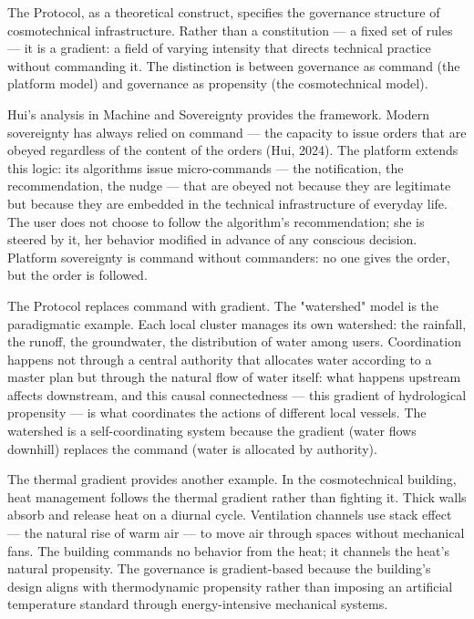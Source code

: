 The   Protocol, as a theoretical construct, specifies the governance structure of cosmotechnical infrastructure. Rather than a constitution — a fixed set of rules — it is a gradient: a field of varying intensity that directs technical practice without commanding it. The distinction is between governance as command (the platform model) and governance as propensity (the cosmotechnical model).

Hui's analysis in Machine and Sovereignty provides the framework. Modern sovereignty has always relied on command — the capacity to issue orders that are obeyed regardless of the content of the orders (Hui, 2024). The platform extends this logic: its algorithms issue micro-commands — the notification, the recommendation, the nudge — that are obeyed not because they are legitimate but because they are embedded in the technical infrastructure of everyday life. The user does not choose to follow the algorithm's recommendation; she is steered by it, her behavior modified in advance of any conscious decision. Platform sovereignty is command without commanders: no one gives the order, but the order is followed.

The  Protocol replaces command with gradient. The "watershed" model is the paradigmatic example. Each local  cluster manages its own watershed: the rainfall, the runoff, the groundwater, the distribution of water among users. Coordination happens not through a central authority that allocates water according to a master plan but through the natural flow of water itself: what happens upstream affects downstream, and this causal connectedness — this gradient of hydrological propensity — is what coordinates the actions of different local vessels. The watershed is a self-coordinating system because the gradient (water flows downhill) replaces the command (water is allocated by authority).

The thermal gradient provides another example. In the cosmotechnical building, heat management follows the thermal gradient rather than fighting it. Thick walls absorb and release heat on a diurnal cycle. Ventilation channels use stack effect — the natural rise of warm air — to move air through spaces without mechanical fans. The building commands no behavior from the heat; it channels the heat's natural propensity. The governance is gradient-based because the building's design aligns with thermodynamic propensity rather than imposing an artificial temperature standard through energy-intensive mechanical systems.

